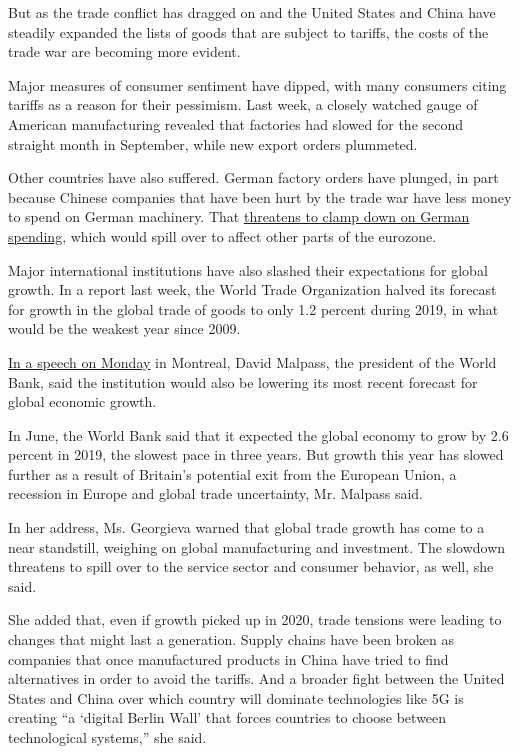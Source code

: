 But as the trade conflict has dragged on and the United States and China
have steadily expanded the lists of goods that are subject to tariffs,
the costs of the trade war are becoming more evident.

Major measures of consumer sentiment have dipped, with many consumers
citing tariffs as a reason for their pessimism. Last week, a closely
watched gauge of American manufacturing revealed that factories had
slowed for the second straight month in September, while new export
orders plummeted.

Other countries have also suffered. German factory orders have plunged,
in part because Chinese companies that have been hurt by the trade war
have less money to spend on German machinery. That
\href{https://www.nytimes.com/2019/10/01/business/wto-global-trade.html}{threatens
to clamp down on German spending}, which would spill over to affect
other parts of the eurozone.

Major international institutions have also slashed their expectations
for global growth. In a report last week, the World Trade Organization
halved its forecast for growth in the global trade of goods to only 1.2
percent during 2019, in what would be the weakest year since 2009.

\href{https://www.worldbank.org/en/news/speech/2019/10/07/driving-growth-from-the-ground-up}{In
a speech on Monday} in Montreal, David Malpass, the president of the
World Bank, said the institution would also be lowering its most recent
forecast for global economic growth.

In June, the World Bank said that it expected the global economy to grow
by 2.6 percent in 2019, the slowest pace in three years. But growth this
year has slowed further as a result of Britain's potential exit from the
European Union, a recession in Europe and global trade uncertainty, Mr.
Malpass said.

In her address, Ms. Georgieva warned that global trade growth has come
to a near standstill, weighing on global manufacturing and investment.
The slowdown threatens to spill over to the service sector and consumer
behavior, as well, she said.

She added that, even if growth picked up in 2020, trade tensions were
leading to changes that might last a generation. Supply chains have been
broken as companies that once manufactured products in China have tried
to find alternatives in order to avoid the tariffs. And a broader fight
between the United States and China over which country will dominate
technologies like 5G is creating ``a `digital Berlin Wall' that forces
countries to choose between technological systems,'' she said.

